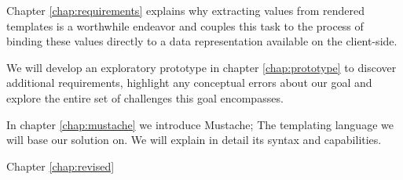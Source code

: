 \documentclass[thesis.tex]{subfiles}
\begin{document}
Chapter \ref{chap:requirements} explains why extracting values from rendered
templates is a worthwhile endeavor and couples this task to the process of
binding these values directly to a data representation available on the
client-side.

We will develop an exploratory prototype in chapter \ref{chap:prototype} to
discover additional requirements, highlight any conceptual errors about our
goal and explore the entire set of challenges this goal encompasses.

In chapter \ref{chap:mustache} we introduce Mustache;
The templating language we will base our solution on. We will explain in detail
its syntax and capabilities.


Chapter \ref{chap:revised}





\end{document}
